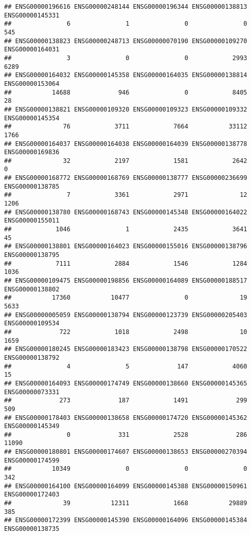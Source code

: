 \documentclass[
]{article}
\begin{document}
\begin{verbatim}
## ENSG00000196616 ENSG00000248144 ENSG00000196344 ENSG00000138813 ENSG00000145331 
##               6               1               0               0             545 
## ENSG00000138823 ENSG00000248713 ENSG00000070190 ENSG00000109270 ENSG00000164031 
##               3               0               0            2993            6289 
## ENSG00000164032 ENSG00000145358 ENSG00000164035 ENSG00000138814 ENSG00000153064 
##           14688             946               0            8405              28 
## ENSG00000138821 ENSG00000109320 ENSG00000109323 ENSG00000109332 ENSG00000145354 
##              76            3711            7664           33112            1766 
## ENSG00000164037 ENSG00000164038 ENSG00000164039 ENSG00000138778 ENSG00000169836 
##              32            2197            1581            2642               0 
## ENSG00000168772 ENSG00000168769 ENSG00000138777 ENSG00000236699 ENSG00000138785 
##               7            3361            2971              12            1206 
## ENSG00000138780 ENSG00000168743 ENSG00000145348 ENSG00000164022 ENSG00000155011 
##            1046               1            2435            3641              45 
## ENSG00000138801 ENSG00000164023 ENSG00000155016 ENSG00000138796 ENSG00000138795 
##            7111            2884            1546            1284            1036 
## ENSG00000109475 ENSG00000198856 ENSG00000164089 ENSG00000188517 ENSG00000138802 
##           17360           10477               0              19            5633 
## ENSG00000005059 ENSG00000138794 ENSG00000123739 ENSG00000205403 ENSG00000109534 
##             722            1018            2498              10            1659 
## ENSG00000180245 ENSG00000183423 ENSG00000138798 ENSG00000170522 ENSG00000138792 
##               4               5             147            4060              15 
## ENSG00000164093 ENSG00000174749 ENSG00000138660 ENSG00000145365 ENSG00000073331 
##             273             187            1491             299             509 
## ENSG00000178403 ENSG00000138658 ENSG00000174720 ENSG00000145362 ENSG00000145349 
##               0             331            2528             286           11090 
## ENSG00000180801 ENSG00000174607 ENSG00000138653 ENSG00000270394 ENSG00000174599 
##           10349               0               0               0             342 
## ENSG00000164100 ENSG00000164099 ENSG00000145388 ENSG00000150961 ENSG00000172403 
##              39           12311            1668           29889             385 
## ENSG00000172399 ENSG00000145390 ENSG00000164096 ENSG00000145384 ENSG00000138735 

\end{verbatim}
\end{document}
